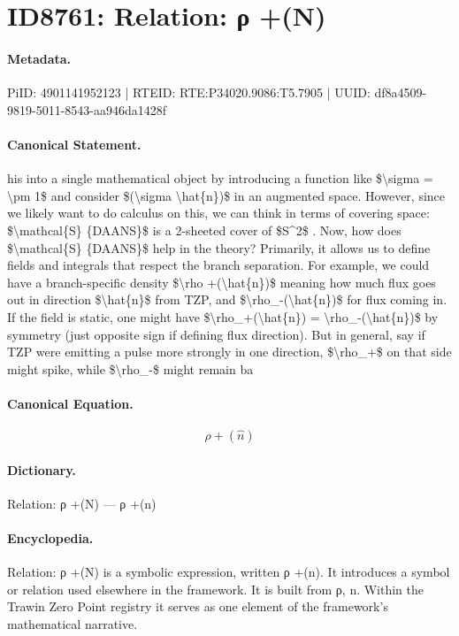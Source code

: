 \section*{ID8761: Relation: ρ +(N)}
\paragraph{Metadata.}
PiID: 4901141952123 | RTEID: RTE:P34020.9086:T5.7905 | UUID: df8a4509-9819-5011-8543-aa946da1428f

\paragraph{Canonical Statement.}
his into a single mathematical object by introducing a function like \$\textbackslash{}sigma = \textbackslash{}pm 1\$ and consider \$(\textbackslash{}sigma \textbackslash{}hat\{n\})\$ in an augmented space. However, since we likely want to do calculus on this, we can think in terms of covering space: \$\textbackslash{}mathcal\{S\} \{DAANS\}\$ is a 2-sheeted cover of \$S\textasciicircum{}2\$ . Now, how does \$\textbackslash{}mathcal\{S\} \{DAANS\}\$ help in the theory? Primarily, it allows us to define fields and integrals that respect the branch separation. For example, we could have a branch-specific density \$\textbackslash{}rho +(\textbackslash{}hat\{n\})\$ meaning how much flux goes out in direction \$\textbackslash{}hat\{n\}\$ from TZP, and \$\textbackslash{}rho\_-(\textbackslash{}hat\{n\})\$ for flux coming in. If the field is static, one might have \$\textbackslash{}rho\_+(\textbackslash{}hat\{n\}) = \textbackslash{}rho\_-(\textbackslash{}hat\{n\})\$ by symmetry (just opposite sign if defining flux direction). But in general, say if TZP were emitting a pulse more strongly in one direction, \$\textbackslash{}rho\_+\$ on that side might spike, while \$\textbackslash{}rho\_-\$ might remain ba

\paragraph{Canonical Equation.}
\[
\rho +(\hat{n})
\]

\paragraph{Dictionary.}
Relation: ρ +(N) — ρ +(n)

\paragraph{Encyclopedia.}
Relation: ρ +(N) is a symbolic expression, written ρ +(n). It introduces a symbol or relation used elsewhere in the framework. It is built from ρ, n. Within the Trawin Zero Point registry it serves as one element of the framework's mathematical narrative.
